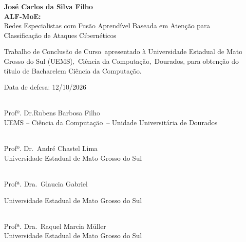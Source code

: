 \documentclass[
	12pt,		%
	a4paper,	%
	openright,  %
	oneside,	%
	chapter=TITLE,		%
	section=TITLE,		%
	english,	%
	brazilian   %
]{abntex2}
\newcommand{\nomeDoAutor}{José Carlos da Silva Filho}
\newcommand{\nomeDoCurso}{Ciência da Computação}
\newcommand{\tituloDoTrabalho}{ALF-MoE}
\newcommand{\subtituloDoTrabalho}{Redes Especialistas com Fusão Aprendível Baseada em Atenção
para Classificação de Ataques Cibernéticos}
\newcommand{\tipoDeTrabalho}{Trabalho de Conclusão de Curso}
\newcommand{\NomeDoCurso}{Ciência da Computação}
\newcommand{\GrauAcademico}{Bacharel}
\newcommand{\dataDeDefesa}{12/10/2026}
\newcommand{\nomeDoOrientador}{Rubens Barbosa Filho}
\newcommand{\tituloDoOrientador}{Profº. Dr.}
\newcommand{\nomeDoMembroA}{André Chastel Lima}
\newcommand{\tituloDoMembroA}{Profº. Dr.}
\newcommand{\instituicaomembroA}{Universidade Estadual de Mato Grosso do Sul}
\newcommand{\nomeDoMembroB}{Glaucia Gabriel}
\newcommand{\tituloDoMembroB}{Profª. Dra.}
\newcommand{\instituicaomembroB}{Universidade Estadual de Mato Grosso do Sul}
\newcommand{\nomeDoMembroC}{Raquel Marcia Müller}
\newcommand{\tituloDoMembroC}{Profª. Dra.}
\newcommand{\instituicaomembroC}{Universidade Estadual de Mato Grosso do Sul}
\newcommand{\nomeDaCidade}{Dourados}
\begin{document}
\imprimircapa
\imprimirfolhaderosto

%
\begin{folhadeaprovacao}

	\begin{center}
		\normalsize{\textbf{\MakeUppercase\nomeDoAutor}}
		\\
		\vspace*{1cm}
		\normalsize{\textbf{\MakeUppercase\tituloDoTrabalho:}}
		\\
		\subtituloDoTrabalho
	\end{center}

	\vspace*{2cm}

	\noindent\tipoDeTrabalho\ apresentado à Universidade Estadual de Mato Grosso do Sul
	(UEMS),\ \NomeDoCurso,\ \nomeDaCidade, para obtenção do título de \GrauAcademico em \nomeDoCurso.
	\par
	\vspace*{1cm}

	\noindent Data de defesa: \dataDeDefesa
	\vspace*{1cm}


	\vspace*{1cm}

	\raggedright\makebox[2.5in]{\hrulefill}\\
	\tituloDoOrientador \nomeDoOrientador \\ UEMS -- \NomeDoCurso\ -- Unidade Universitária de \nomeDaCidade

	\vspace*{1cm}

	\raggedright\makebox[2.5in]{\hrulefill}\\
	\tituloDoMembroA\ \nomeDoMembroA \\ \instituicaomembroA

	\vspace*{1cm}

	\raggedright\makebox[2.5in]{\hrulefill}\\
	\tituloDoMembroB\ \nomeDoMembroB \par \instituicaomembroB

	\vspace*{1cm}

	\raggedright\makebox[2.5in]{\hrulefill}\\
	\tituloDoMembroC\ \nomeDoMembroC \\ \instituicaomembroC

\end{folhadeaprovacao}
\end{document}
